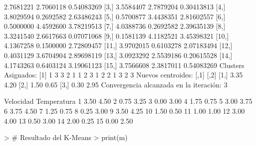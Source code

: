 \documentclass[a4paper, 12pt]{article}
\begin{document}
\begin{itemize}
\begin{Schunk}
\begin{Soutput}
 [2,] 2.7681221 2.7060118 0.54083269
 [3,] 3.5584407 2.7879204 0.30413813
 [4,] 3.8029594 0.2692582 2.63486243
 [5,] 0.5700877 3.4438351 2.81602557
 [6,] 0.5000000 4.4592600 3.78219513
 [7,] 4.0388736 0.2692582 2.39635139
 [8,] 3.3241540 2.6617663 0.07071068
 [9,] 0.1581139 4.1182521 3.45398321
[10,] 4.1367258 0.1500000 2.72809457
[11,] 3.9702015 0.6103278 2.07183494
[12,] 0.4031129 3.6704904 2.89698119
[13,] 3.0923292 2.5539186 0.20615528
[14,] 4.1743263 0.6403124 3.19061123
[15,] 3.7566608 2.3817011 0.54083269
Clusters Asignados:
 [1] 1 3 3 2 1 1 2 3 1 2 2 1 3 2 3
Nuevos centroides: 
     [,1] [,2]
[1,] 3.35 4.20
[2,] 1.50 0.65
[3,] 0.30 2.95
Convergencia alcanzada en la iteración: 3 
\end{Soutput}
\begin{Soutput}
   Velocidad Temperatura
1       3.50        4.50
2       0.75        3.25
3       0.00        3.00
4       1.75        0.75
5       3.00        3.75
6       3.75        4.50
7       1.25        0.75
8       0.25        3.00
9       3.50        4.25
10      1.50        0.50
11      1.00        1.00
12      3.00        4.00
13      0.50        3.00
14      2.00        0.25
15      0.00        2.50
\end{Soutput}
\begin{Sinput}
> # Resultado del K-Means
> print(m)
\end{Sinput}
\end{Schunk}
\end{itemize}
\end{document}
